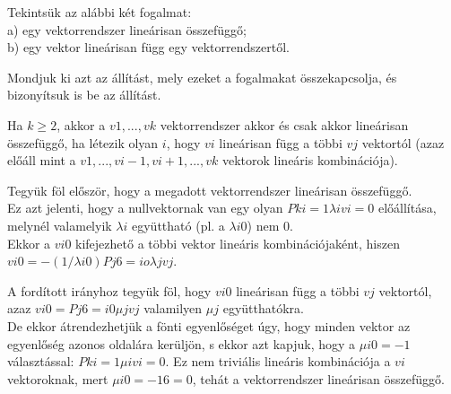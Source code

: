 \begin{frame}
  \begin{tcolorbox}[title={2. (4p)}]
     Tekintsük az alábbi két fogalmat:\\
     a) egy vektorrendszer lineárisan összefüggő;\\
     b) egy vektor lineárisan függ egy vektorrendszertől.\\
     \mmedskip
     
     Mondjuk ki azt az állítást, mely ezeket a fogalmakat összekapcsolja, és bizonyítsuk is be az állítást.
  \tcblower
  
    Ha $k \geq 2$, akkor a $v1,...,vk$ vektorrendszer akkor és csak akkor lineárisan összefüggő, ha létezik olyan $i$, hogy $vi$ lineárisan függ a többi $vj$ vektortól (azaz előáll mint a $v1,...,vi-1,vi+1,...,vk$ vektorok lineáris kombinációja).\\
    \mmedskip
    
    Tegyük föl először, hogy a megadott vektorrendszer lineárisan összefüggő.\\
    Ez azt jelenti, hogy a nullvektornak van egy olyan $Pk i=1 {\lambda}ivi = 0$ előállítása, melynél valamelyik ${\lambda}i$ együttható (pl. a ${\lambda}i0$) nem $0$.\\
    
    Ekkor a $vi0$ kifejezhető a többi vektor lineáris kombinációjaként, hiszen $vi0 = -(1/{\lambda}i0)Pj6=io {\lambda}jvj$.\\
    \mmedskip
    
    A fordított irányhoz tegyük föl, hogy $vi0$ lineárisan függ a többi $vj$ vektortól, azaz $vi0 = Pj6=i0 {\mu}jvj$ valamilyen ${\mu}j$ együtthatókra.\\
    
    De ekkor átrendezhetjük a fönti egyenlőséget úgy, hogy minden vektor az egyenlőség azonos oldalára kerüljön, s ekkor azt kapjuk, hogy a ${\mu}i0 = -1$ választással: $Pk i=1 {\mu}ivi = 0$. Ez nem triviális lineáris kombinációja a $vi$ vektoroknak, mert ${\mu}i0 = -1 6= 0$, tehát a vektorrendszer lineárisan összefüggő.
  \end{tcolorbox}
\end{frame}


